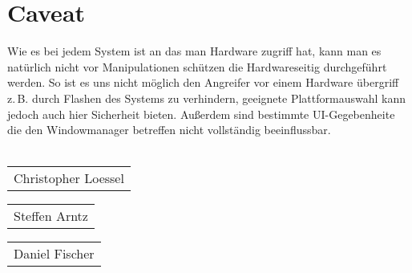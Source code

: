 \documentclass[12pt,a4paper,ngerman]{scrartcl}
\newcommand{\zB}{\mbox{z.\,B.}\xspace}
\begin{document}
\section*{Caveat}
Wie es bei jedem System ist an das man Hardware zugriff hat, kann man es natürlich nicht vor Manipulationen schützen die Hardwareseitig durchgeführt werden. So ist es uns nicht möglich den Angreifer vor einem Hardware übergriff \zB durch Flashen des Systems zu verhindern, geeignete Plattformauswahl kann jedoch auch hier Sicherheit bieten. Außerdem sind bestimmte UI-Gegebenheite die den Windowmanager betreffen nicht vollständig beeinflussbar.
\\ \\
\begin{center}
\begin{tabular}{@{}l@{}}\hline
Christopher Loessel
\end{tabular} \hspace{1cm}
\begin{tabular}{@{}l@{}}\hline
Steffen Arntz
\end{tabular} \hspace{1cm}
\begin{tabular}{@{}l@{}}\hline
Daniel Fischer
\end{tabular} 

\end{center}
\end{document}

